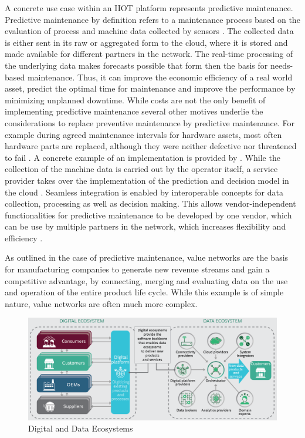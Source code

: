 A concrete use case within an \ac{IIOT} platform represents predictive maintenance. Predictive maintenance by definition refers to a maintenance process based on the evaluation of process and machine data collected by sensors \cite[p. 1670]{Selcuk2016PredictiveTrends:}. The collected data is either sent in its raw or aggregated form to the cloud, where it is stored and made available for different partners in the network. The real-time processing of the underlying data makes forecasts possible that form then the basis for needs-based maintenance. Thus, it can improve the economic efficiency of a real world asset, predict the optimal time for maintenance and improve the performance by minimizing unplanned downtime. While costs are not the only benefit of implementing predictive maintenance several other motives underlie the considerations to replace preventive maintenance by predictive maintenance. For example during agreed maintenance intervals for hardware assets, most often hardware parts are replaced, although they were neither defective nor threatened to fail \cite[p. 1672]{Selcuk2016PredictiveTrends:}. A concrete example of an implementation is provided by \citeauthor{Cavalieri2020AShell}. While the collection of the machine data is carried out by the operator itself, a service provider takes over the implementation of the prediction and decision model in the cloud \cite[p. 11]{Cavalieri2020AShell}. Seamless integration is enabled by interoperable concepts for data collection, processing as well as decision making. This allows vendor-independent functionalities for predictive maintenance to be developed by one vendor, which can be use by multiple partners in the network, which increases flexibility and efficiency \cite[p. 9]{Cavalieri2020AShell}.

As outlined in the case of predictive maintenance, value networks are the basis for manufacturing companies to generate new revenue streams and gain a competitive advantage, by connecting, merging and evaluating data on the use and operation of the entire product life cycle. While this example is of simple nature, value networks are often much more complex.

\begin{figure}[h]
\includegraphics[scale=0.35]{content/pictures/digital_ecosystems_bcg.png}
\caption{Digital and Data Ecosystems}
\label{fig:valuenetworksi40}
\end{figure}

